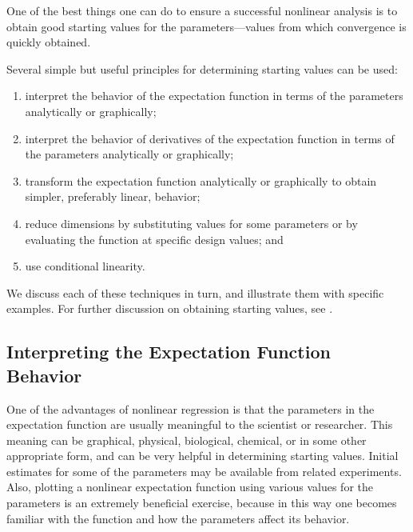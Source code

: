 One of the best things one can do to ensure a
successful nonlinear analysis is to obtain good starting values
for the parameters---values from which convergence is quickly obtained.

Several simple but useful principles for determining starting values
can be used:
\begin{enumerate}
  \item interpret the behavior of the expectation function in terms of
        the parameters analytically or graphically;
  \item interpret the behavior of derivatives of the expectation
        function in terms of the parameters analytically or graphically;
  \item transform the expectation function analytically or
        graphically to obtain simpler, preferably linear, behavior;
  \item reduce dimensions by substituting values for some
        parameters or by evaluating the function at specific design
        values; and
  \item use conditional linearity.
\end{enumerate}

We discuss each of these techniques in turn, and illustrate them
with specific examples.
For further discussion on obtaining starting values, see
.
\subsection{Interpreting the Expectation Function Behavior}

One of the advantages of nonlinear regression is that the
parameters in the expectation function are usually meaningful to
the scientist or researcher.
This meaning can be graphical, physical, biological, chemical, or in
some other appropriate form, and can be very helpful in
determining starting values.
Initial estimates for some of the parameters may be available from
related experiments.
Also, plotting a nonlinear expectation function using various
values for the parameters
is an extremely beneficial exercise, because
in this way one becomes familiar with the function and how the parameters
affect its behavior.


